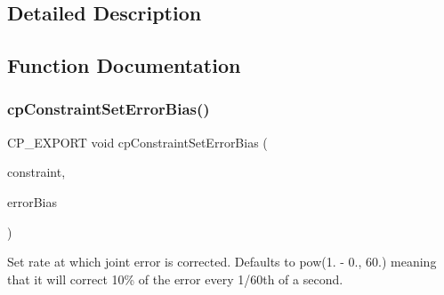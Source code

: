 \subsection{Detailed Description}


\subsection{Function Documentation}
\mbox{\label{group__cp_constraint_gacd4448af488e19721f3755f9ddaece9d}} 
\subsubsection{\texorpdfstring{cp\+Constraint\+Set\+Error\+Bias()}{cpConstraintSetErrorBias()}}
{\footnotesize\ttfamily C\+P\+\_\+\+E\+X\+P\+O\+RT void cp\+Constraint\+Set\+Error\+Bias (\begin{DoxyParamCaption}\item[{\mbox{\hyperlink{structcp_constraint}{cp\+Constraint}} $\ast$}]{constraint,  }\item[{\mbox{\hyperlink{group__basic_types_gac1ed65573e035bf892505768c852d8d3}{cp\+Float}}}]{error\+Bias }\end{DoxyParamCaption})}

Set rate at which joint error is corrected. Defaults to pow(1. -\/ 0., 60.) meaning that it will correct 10\% of the error every 1/60th of a second. 